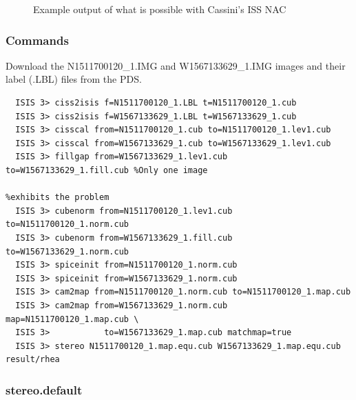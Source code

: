 \begin{figure}[p]
  \hfil
\caption{Example output of what is possible with Cassini's ISS NAC}
\label{fig:cassini-exampe}
\end{figure}

\subsubsection*{Commands}

Download the N1511700120\_1.IMG and W1567133629\_1.IMG images and their label (.LBL) files from the \ac{PDS}.
\begin{verbatim}
  ISIS 3> ciss2isis f=N1511700120_1.LBL t=N1511700120_1.cub
  ISIS 3> ciss2isis f=W1567133629_1.LBL t=W1567133629_1.cub
  ISIS 3> cisscal from=N1511700120_1.cub to=N1511700120_1.lev1.cub
  ISIS 3> cisscal from=W1567133629_1.cub to=W1567133629_1.lev1.cub
  ISIS 3> fillgap from=W1567133629_1.lev1.cub to=W1567133629_1.fill.cub %Only one image
                                                                        %exhibits the problem
  ISIS 3> cubenorm from=N1511700120_1.lev1.cub to=N1511700120_1.norm.cub
  ISIS 3> cubenorm from=W1567133629_1.fill.cub to=W1567133629_1.norm.cub
  ISIS 3> spiceinit from=N1511700120_1.norm.cub
  ISIS 3> spiceinit from=W1567133629_1.norm.cub
  ISIS 3> cam2map from=N1511700120_1.norm.cub to=N1511700120_1.map.cub
  ISIS 3> cam2map from=W1567133629_1.norm.cub map=N1511700120_1.map.cub \
  ISIS 3>           to=W1567133629_1.map.cub matchmap=true
  ISIS 3> stereo N1511700120_1.map.equ.cub W1567133629_1.map.equ.cub result/rhea
\end{verbatim}

\subsubsection*{stereo.default}

